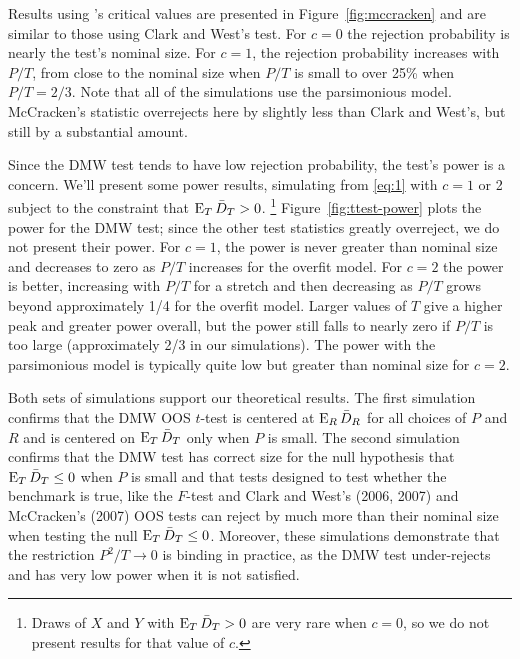\documentclass[11pt]{article}
\newcommand{\citepos}[1]{\citeauthor{#1}'s \citeyearpar{#1}}
\begin{document}
Results using \citepos{Mcc:07} critical values are
presented in Figure~\ref{fig:mccracken} and are similar to those using
Clark and West's test.  For $c=0$ the rejection probability is nearly
the test's nominal size.  For $c=1$, the rejection probability
increases with $P/T$, from close to the nominal size when $P/T$ is
small to over 25\% when $P/T = 2/3$.  Note that all of the simulations
use the parsimonious model.  McCracken's statistic overrejects here
by slightly less than Clark and West's, but still by a substantial
amount.

Since the DMW test tends to have low rejection probability, the
test's power is a concern.  We'll present some power results,
simulating from \eqref{eq:1} with $c = 1$ or 2 subject to the
constraint that $\operatorname{E}_T \bar{D}_{T} > 0$.%
\footnote{Draws of $X$ and $Y$ with
  $\operatorname{E}_T \bar{D}_{T} > 0$ are very rare when $c=0$, so we do not present
  results for that value of $c$.} %
Figure~\ref{fig:ttest-power} plots
the power for the DMW test; since the other test statistics greatly
overreject, we do not present their power.  For $c=1$, the power is
never greater than nominal size and decreases to zero as $P/T$
increases for the overfit model.  For $c=2$ the power is better,
increasing with $P/T$ for a stretch and then decreasing as $P/T$ grows
beyond approximately 1/4 for the overfit model.  Larger values of $T$
give a higher peak and greater power overall, but the power still
falls to nearly zero if $P/T$ is too large (approximately 2/3 in our
simulations).  The power with the parsimonious model is typically
quite low but greater than nominal size for $c = 2$.

Both sets of simulations support our theoretical results.  The first
simulation confirms that the DMW OOS $t$-test is centered at $\operatorname{E}_R
\bar{D}_{R}$ for all choices of $P$ and $R$ and is centered on $\operatorname{E}_T \bar{D}_{T}$
only when $P$ is small.  The second simulation confirms that the DMW
test has correct size for the null hypothesis that $\operatorname{E}_T \bar{D}_{T} \leq 0$
when $P$ is small and that tests designed to test whether the
benchmark is true, like the $F$-test and Clark and West's (2006, 2007)
and McCracken's (2007) OOS tests can reject by much more than their
nominal size when testing the null $\operatorname{E}_T \bar{D}_{T} \leq 0$.  Moreover,
these simulations demonstrate that the restriction $P^2/T \to 0$ is
binding in practice, as the DMW test under-rejects and has very low
power when it is not satisfied.
\end{document}
